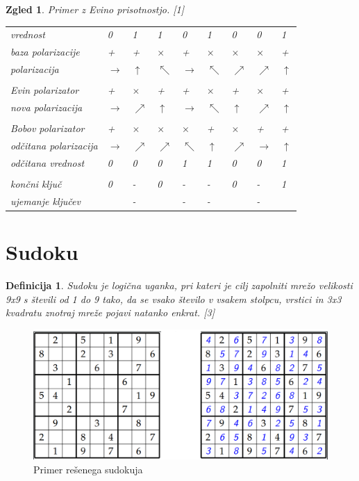 \documentclass[A4paper, 11pt]{article}
\newtheorem{definicija}{Definicija}
\newtheorem{zgled}{Zgled}
\newcommand{\cmark}{\ding{51}}
\newcommand{\xmark}{\ding{55}}
\begin{document}
\begin{zgled} 
Primer z Evino prisotnostjo. [1]

\begin{center}
\begin{tabular}{ l m{0.3 cm} m{0.3 cm} m{0.3 cm} m{0.3 cm} m{0.3 cm} m{0.3 cm} m{0.3 cm} m{0.3 cm}}
vrednost & 0 & 1 & 1 & 0 & 1 & 0 & 0 & 1\\
baza polarizacije & + & + & $\times$ & + & $\times$ & $\times$ & $\times$ & + \\
polarizacija & $\rightarrow$ & $\uparrow$ & $\nwarrow$ & $\rightarrow$ & $\nwarrow$ & $\nearrow$ & $\nearrow$  & $\uparrow$\\
\\
Evin polarizator & + & $\times$ & + & + & $\times$ & + & $\times$ & +\\
nova polarizacija & $\rightarrow$ & $\nearrow$ & $\uparrow$ & $\rightarrow$ & $\nwarrow$  & $\uparrow$ & $\nearrow$ & $\uparrow$\\
\\
Bobov polarizator & + & $\times$ & $\times$ & $\times$ & + & $\times$ & + & +\\
odčitana polarizacija & $\rightarrow$ & $\nearrow$ & $\nearrow$ & $\nwarrow$ & $\uparrow$  & $\nearrow$ & $\rightarrow$ & $\uparrow$\\
odčitana vrednost & 0 & 0 & 0 & 1 & 1 & 0 & 0 & 1\\
\\
končni ključ & 0 & - & 0 & - & - & 0 & - & 1\\
ujemanje ključev & \cmark & - & \xmark & - & - & \cmark & - & \cmark\\ 
\end{tabular}
\end{center}

\end{zgled}



\section{Sudoku}

\begin{definicija}
Sudoku je logična uganka, pri kateri je cilj zapolniti mrežo velikosti 9x9 s števili od 1 do 9 tako, da se vsako število v vsakem stolpcu, vrstici in 3x3 kvadratu znotraj mreže pojavi natanko enkrat. [3]
\end{definicija}

\begin{figure}[h]
\centering
\caption{Primer rešenega sudokuja}
\includegraphics[scale=0.4]{sudoku_resen}
\end{figure}
\end{document}
